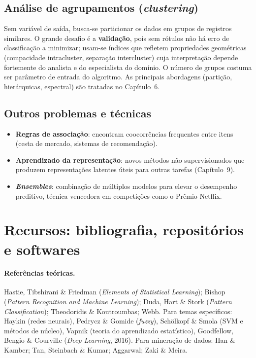 \subsection{Análise de agrupamentos (\emph{clustering})}

Sem variável de saída, busca-se particionar os dados em grupos de
registros similares. O grande desafio é a \textbf{validação}, pois sem
rótulos não há erro de classificação a minimizar; usam-se índices que
refletem propriedades geométricas (compacidade intracluster, separação
intercluster) cuja interpretação depende fortemente do analista e do
especialista do domínio. O número de grupos costuma ser parâmetro de
entrada do algoritmo. As principais abordagens (partição, hierárquicas,
espectral) são tratadas no Capítulo~6.

\subsection{Outros problemas e técnicas}

\begin{itemize}[leftmargin=1.2cm]
  \item \textbf{Regras de associação}: encontram coocorrências
        frequentes entre itens (cesta de mercado, sistemas de
        recomendação).
  \item \textbf{Aprendizado da representação}: novos métodos não
        supervisionados que produzem representações latentes úteis para
        outras tarefas (Capítulo~9).
  \item \textbf{\emph{Ensembles}}: combinação de múltiplos modelos para
        elevar o desempenho preditivo, técnica vencedora em competições
        como o Prêmio Netflix.
\end{itemize}

\section{Recursos: bibliografia, repositórios e softwares}

\paragraph{Referências teóricas.} Hastie, Tibshirani \& Friedman
(\emph{Elements of Statistical Learning}); Bishop (\emph{Pattern
Recognition and Machine Learning}); Duda, Hart \& Stork (\emph{Pattern
Classification}); Theodoridis \& Koutroumbas; Webb. Para temas
específicos: Haykin (redes neurais), Pedrycz \& Gomide (\emph{fuzzy}),
Schölkopf \& Smola (SVM e métodos de núcleo), Vapnik (teoria do
aprendizado estatístico), Goodfellow, Bengio \& Courville (\emph{Deep
Learning}, 2016). Para mineração de dados: Han \& Kamber; Tan, Steinbach
\& Kumar; Aggarwal; Zaki \& Meira.

